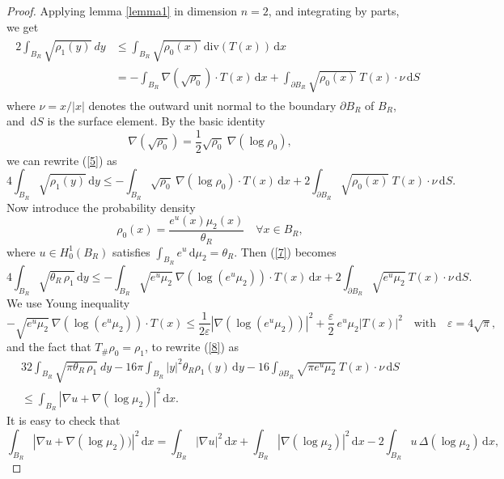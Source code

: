 \documentclass[10pt]{article}
\numberwithin{equation}{section}
\theoremstyle{plain}
\theoremstyle{definition}
\theoremstyle{remark}
\newcommand{\ib}{\int_{B_R}}
\newcommand\vep{\varepsilon}
\newcommand\dd{\,\mbox{d} }
\def\div{\mbox{div} }
\begin{document}
\begin{proof} Applying lemma \ref{lemma1} in dimension $n=2$, and integrating by parts, we get
\begin{align}\label{5}
\begin{split}
2 \int_{B_R} \sqrt{\rho_1 (y)} \ dy & \leq \int_{B_R} \sqrt{\rho_0 (x)}\ \div (T(x)) \dd x \\
&= - \int_{B_R} \nabla (\sqrt{\rho_0}) \cdot T(x) \dd x + \int_{\partial B_R} \sqrt{\rho_0 (x)} \ T(x) \cdot \nu \dd S 
\end{split}
\end{align}
where $\nu=x/|x|$ denotes the outward unit normal to the boundary $\partial B_R$ of $B_R$, and $\dd S$ is the surface element.  By the basic identity
\[\nabla\left(\sqrt{\rho_0}\right) = \frac{1}{2} \sqrt{\rho_0} \ \nabla (\log \rho_0),\]
we can rewrite (\ref{5}) as
 \begin{equation}\label{7}
 4 \int_{B_R} \sqrt{\rho_1 (y)} \dd y \leq - \int_{B_R} \sqrt{\rho_0} \ \nabla (\log \rho_0)\cdot T(x) \dd x + 2 \int_{\partial B_R} \sqrt{\rho_0 (x)} \ T(x) \cdot \nu \dd S.
 \end{equation}
Now introduce the probability density 
\[\rho_0 (x)= \frac{e^u(x) \mu_2(x)}{\theta_R} \quad \forall x\in B_R,\]
where $u\in H^1_0(B_R)$ satisfies $\int_{B_R}e^u\dd\mu_2 =\theta_R$. Then (\ref{7}) becomes
 \begin{equation}\label{8}
  4 \int_{B_R} \sqrt{\theta_R\, \rho_1} \dd y \leq - \int_{B_R} \sqrt{e^u \mu_2} \ \nabla \left(\log (e^u \mu_2)\right)\cdot T(x) \dd x + 2 \int_{\partial B_R} \sqrt{e^u \mu_2} \ T(x) \cdot \nu \dd S.
 \end{equation}
We use Young inequality
\[-  \sqrt{e^u \mu_2} \ \nabla \left(\log (e^u \mu_2)\right)\cdot T(x) \leq \frac{1}{2\varepsilon} |\nabla \left(\log (e^u \mu_2)\right)|^2 + \frac{\varepsilon}{2} \ e^u \mu_2 |T(x)|^2 \quad \mbox{with} \quad \vep=4\sqrt{\pi},\]
and the fact that $T_{\#}\rho_0=\rho_1$, to rewrite (\ref{8}) as
\begin{eqnarray}\label{9}
32\int_{B_R} \sqrt{\pi\theta_R\, \rho_1} \ dy  - 16\pi\int_{B_R}|y|^2\theta_R\rho_1(y) \dd y - 16\int_{\partial B_R} \sqrt{\pi e^u \mu_2} \ T(x) \cdot \nu \dd S  \nonumber \\
 \leq  \int_{B_R} |\nabla u+\nabla(\log\mu_2)|^2\dd x. \qquad \qquad \qquad \qquad
\end{eqnarray}
It is easy to check that 
\[\ib |\nabla u+ \nabla (\log \mu_2))|^2 \dd x = \ib |\nabla u|^2 \dd x +\ib |\nabla (\log \mu_2)|^2 \dd x - 2 \ib  u\, \Delta (\log \mu_2) \dd x,\]

\end{proof}
\end{document}
